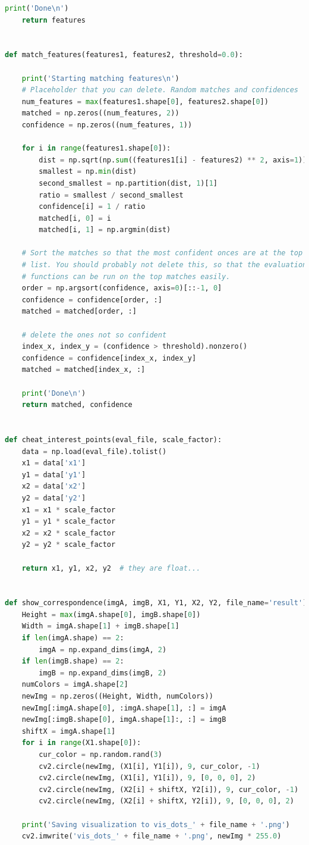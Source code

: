 \documentclass{article}
\begin{document}
\begin{lstlisting}[language=Python]
    print('Done\n')
    return features


def match_features(features1, features2, threshold=0.0):

    print('Starting matching features\n')
    # Placeholder that you can delete. Random matches and confidences
    num_features = max(features1.shape[0], features2.shape[0])
    matched = np.zeros((num_features, 2))
    confidence = np.zeros((num_features, 1))

    for i in range(features1.shape[0]):
        dist = np.sqrt(np.sum((features1[i] - features2) ** 2, axis=1))  # (n2,k)->n2
        smallest = np.min(dist)
        second_smallest = np.partition(dist, 1)[1]
        ratio = smallest / second_smallest
        confidence[i] = 1 / ratio
        matched[i, 0] = i
        matched[i, 1] = np.argmin(dist)

    # Sort the matches so that the most confident onces are at the top of the
    # list. You should probably not delete this, so that the evaluation
    # functions can be run on the top matches easily.
    order = np.argsort(confidence, axis=0)[::-1, 0]
    confidence = confidence[order, :]
    matched = matched[order, :]

    # delete the ones not so confident
    index_x, index_y = (confidence > threshold).nonzero()
    confidence = confidence[index_x, index_y]
    matched = matched[index_x, :]

    print('Done\n')
    return matched, confidence


def cheat_interest_points(eval_file, scale_factor):
    data = np.load(eval_file).tolist()
    x1 = data['x1']
    y1 = data['y1']
    x2 = data['x2']
    y2 = data['y2']
    x1 = x1 * scale_factor
    y1 = y1 * scale_factor
    x2 = x2 * scale_factor
    y2 = y2 * scale_factor

    return x1, y1, x2, y2  # they are float...


def show_correspondence(imgA, imgB, X1, Y1, X2, Y2, file_name='result'):
    Height = max(imgA.shape[0], imgB.shape[0])
    Width = imgA.shape[1] + imgB.shape[1]
    if len(imgA.shape) == 2:
        imgA = np.expand_dims(imgA, 2)
    if len(imgB.shape) == 2:
        imgB = np.expand_dims(imgB, 2)
    numColors = imgA.shape[2]
    newImg = np.zeros((Height, Width, numColors))
    newImg[:imgA.shape[0], :imgA.shape[1], :] = imgA
    newImg[:imgB.shape[0], imgA.shape[1]:, :] = imgB
    shiftX = imgA.shape[1]
    for i in range(X1.shape[0]):
        cur_color = np.random.rand(3)
        cv2.circle(newImg, (X1[i], Y1[i]), 9, cur_color, -1)
        cv2.circle(newImg, (X1[i], Y1[i]), 9, [0, 0, 0], 2)
        cv2.circle(newImg, (X2[i] + shiftX, Y2[i]), 9, cur_color, -1)
        cv2.circle(newImg, (X2[i] + shiftX, Y2[i]), 9, [0, 0, 0], 2)

    print('Saving visualization to vis_dots_' + file_name + '.png')
    cv2.imwrite('vis_dots_' + file_name + '.png', newImg * 255.0)
\end{lstlisting}
\end{document}
